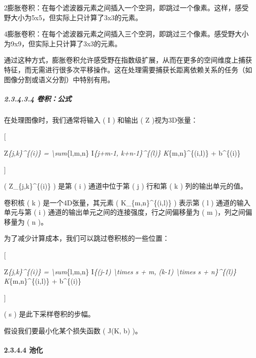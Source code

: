 2膨胀卷积：在每个滤波器元素之间插入一个空洞，即跳过一个像素。这样，感受野大小为5x5，但实际上只计算了3x3的元素。

4膨胀卷积：在每个滤波器元素之间插入三个空洞，即跳过三个像素。感受野大小为9x9，但实际上只计算了3x3的元素。

通过这种方式，膨胀卷积允许感受野在指数级扩展，从而在更多的空间维度上捕获特征，而无需进行很多次平移操作。这在处理需要捕获长距离依赖关系的任务（如图像分割或语义分割）中特别有用。

\subparagraph{\texorpdfstring{\textbf{2.3.4.3.4}
\textbf{卷积：公式}}{2.3.4.3.4 卷积：公式}}\label{23434-ux5377ux79efux516cux5f0f}

在处理图像时，我们通常将输入 ( I ) 和输出 ( Z )视为3D张量：

{[}

Z\emph{\{j,k\}\^{}\{(i)\} = \textbackslash sum}\{l,m,n\} I\emph{\{j+m-1,
k+n-1\}\^{}\{(l)\} K}\{m,n\}\^{}\{(i,l)\} + b\^{}\{(i)\}

{]}


( Z\_\{j,k\}\^{}\{(i)\} ) 是第 ( i ) 通道中位于第 ( j ) 行和第 ( k )
列的输出单元的值。

卷积核 ( k ) 是一个4D张量，其元素 ( K\_\{m,n\}\^{}\{(i,l)\} ) 表示第 ( l
) 通道的输入单元与第 ( i ) 通道的输出单元之间的连接强度，行之间偏移量为
( m )，列之间偏移量为 ( n )。

为了减少计算成本，我们可以跳过卷积核的一些位置：

{[}

Z\emph{\{j,k\}\^{}\{(i)\} = \textbackslash sum}\{l,m,n\} I\emph{\{(j-1)
\textbackslash times s + m, (k-1) \textbackslash times s +
n\}\^{}\{(l)\} K}\{m,n\}\^{}\{(i,l)\} + b\^{}\{(i)\}

{]}


( s ) 是此下采样卷积的步幅。

假设我们要最小化某个损失函数 ( J(K, b) )。

\paragraph{\texorpdfstring{\textbf{2.3.4.4
池化}}{2.3.4.4 池化}}\label{2344-ux6c60ux5316}

